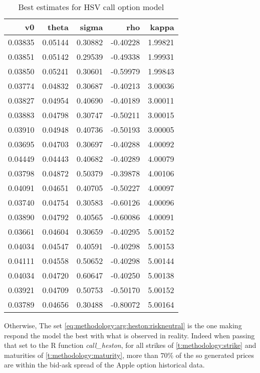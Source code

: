 \documentclass[12pt]{report}
\begin{document}
\begin{table}[ht]
\centering
\begin{tabular}{rrrrr}
  \hline
v0 & theta & sigma & rho & kappa \\ 
  \hline
0.03835 & 0.05144 & 0.30882 & -0.40228 & 1.99821 \\ 
  0.03851 & 0.05142 & 0.29539 & -0.49338 & 1.99931 \\ 
  0.03850 & 0.05241 & 0.30601 & -0.59979 & 1.99843 \\ 
  0.03774 & 0.04832 & 0.30687 & -0.40213 & 3.00036 \\ 
  0.03827 & 0.04954 & 0.40690 & -0.40189 & 3.00011 \\ 
  0.03883 & 0.04798 & 0.30747 & -0.50211 & 3.00015 \\ 
  0.03910 & 0.04948 & 0.40736 & -0.50193 & 3.00005 \\ 
  0.03695 & 0.04703 & 0.30697 & -0.40288 & 4.00092 \\ 
  0.04449 & 0.04443 & 0.40682 & -0.40289 & 4.00079 \\ 
  0.03798 & 0.04872 & 0.50379 & -0.39878 & 4.00106 \\ 
  0.04091 & 0.04651 & 0.40705 & -0.50227 & 4.00097 \\ 
  0.03740 & 0.04754 & 0.30583 & -0.60126 & 4.00096 \\ 
  0.03890 & 0.04792 & 0.40565 & -0.60086 & 4.00091 \\ 
  0.03661 & 0.04604 & 0.30659 & -0.40295 & 5.00152 \\ 
  0.04034 & 0.04547 & 0.40591 & -0.40298 & 5.00153 \\ 
  0.04111 & 0.04558 & 0.50652 & -0.40298 & 5.00144 \\ 
  0.04034 & 0.04720 & 0.60647 & -0.40250 & 5.00138 \\ 
  0.03921 & 0.04709 & 0.50753 & -0.50170 & 5.00152 \\ 
  0.03789 & 0.04656 & 0.30488 & -0.80072 & 5.00164 \\ 
   \hline
\end{tabular}
\caption{Best estimates for HSV call option model} 
\label{t:methodology:call:heston:estimate1}
\end{table}

Otherwise, The set \ref{eq:methodology:arg:heston:riskneutral} is the one making respond the model the best with what is observed in reality.
Indeed when passing that set to the R function \textit{call\_heston}, for all strikes of \cref{t:methodology:strike} and maturities of \cref{t:methodology:maturity}, more than $70\%$ of the so generated prices are within the bid-ask spread of the Apple option historical data.
\end{document}
